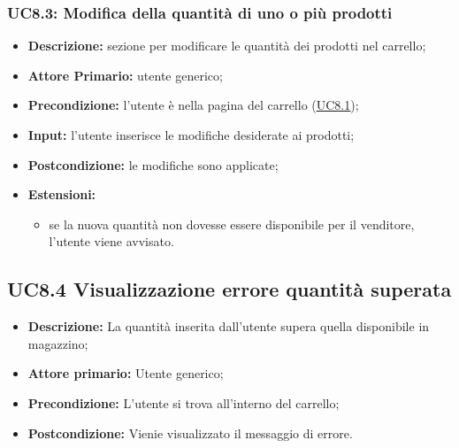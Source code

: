         \subsubsection{UC8.3: Modifica della quantità di uno o più prodotti}
        \begin{itemize}
            \item \textbf{Descrizione:} sezione per modificare le quantità dei prodotti nel carrello;
            \item \textbf{Attore Primario:} utente generico;
            \item \textbf{Precondizione:} l'utente è nella pagina del carrello (\hyperref[sec:UC8.1]{\underline{UC8.1}});
            \item \textbf{Input:} l'utente inserisce le modifiche desiderate ai prodotti;
            \item \textbf{Postcondizione:} le modifiche sono applicate;
            \item \textbf{Estensioni:} 
                \begin{itemize}
                    \item se la nuova quantità non dovesse essere disponibile per il venditore, l'utente viene avvisato.
                \end{itemize}
        \end{itemize}
        \subsection{UC8.4 Visualizzazione errore quantità superata}
        \begin{itemize}
            \item \textbf{Descrizione:} La quantità inserita dall'utente supera quella disponibile in magazzino;
            \item \textbf{Attore primario:} Utente generico;
            \item \textbf{Precondizione:} L'utente si trova all'interno del carrello;
            \item \textbf{Postcondizione:} Vienie visualizzato il messaggio di errore.
        \end{itemize}
